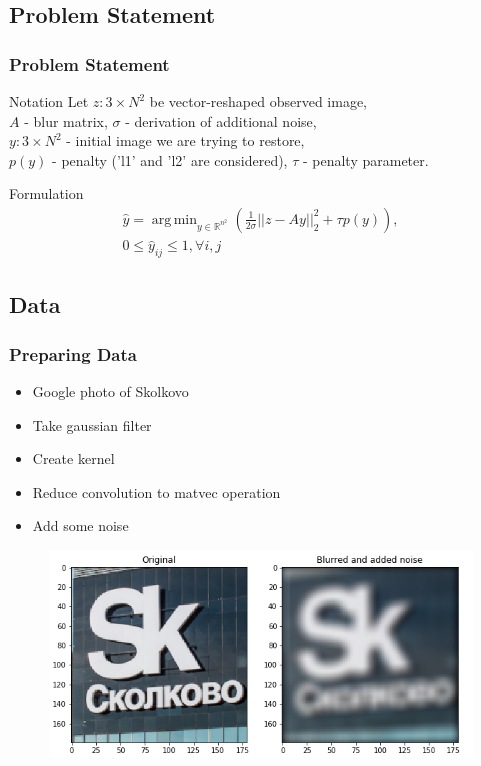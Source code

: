 \documentclass[hyperref={pdfpagelabels=false}]{beamer}
\DeclareMathOperator*{\argmin}{arg\,min}
\begin{document}
\subsection{Problem Statement}
\begin{frame}
\frametitle{Problem Statement} 

\begin{block}{Notation}
Let $z:3 \times N^2$ be vector-reshaped observed image, \\
$A$ - blur matrix, $\sigma$ - derivation of additional noise, \\
$y: 3 \times N^2$ - initial image we are trying to restore, \\
$p(y)$ - penalty ('l1' and 'l2' are considered), $\tau$ - penalty parameter.
\end{block}

\begin{block}{Formulation}
\begin{align}
\hat y = \argmin_{y\in \mathbb{R}^{n^2}}  \left( \frac{1}{2\sigma} ||z - Ay ||_2^2 + \tau p(y) \right), \\
0 \leq \hat y_{ij} \leq 1, \forall i,j
\end{align}
\end{block}


\end{frame}
\subsection{Data}
\begin{frame}
\frametitle{Preparing Data}

\begin{itemize}
\item Google photo of Skolkovo
\item Take gaussian filter
\item Create kernel
\item Reduce convolution to matvec operation
\item Add some noise
\end{itemize}

\begin{center}
\begin{figure}[h]
\includegraphics[scale=0.53]{filter.png}
\end{figure}
\end{center}

\end{frame}
\end{document}
